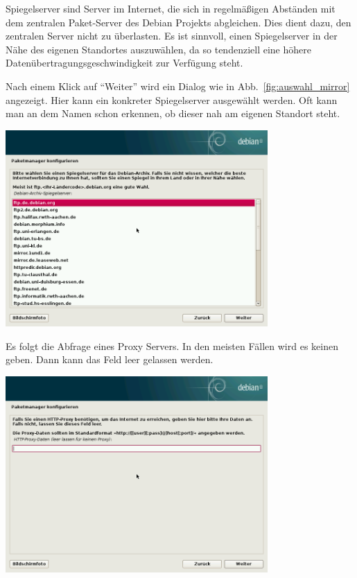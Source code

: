 \documentclass[a4paper,12pt,twoside]{article}
\begin{document}
Spiegelserver sind Server im Internet, die sich in regelmäßigen
Abständen mit dem zentralen Paket-Server des Debian Projekts
abgleichen. Dies dient dazu, den zentralen Server nicht zu überlasten.
Es ist sinnvoll, einen Spiegelserver in der Nähe des eigenen Standortes
auszuwählen, da so tendenziell eine höhere
Datenübertragungsgeschwindigkeit zur Verfügung steht.

Nach einem Klick auf "`Weiter"' wird
ein Dialog wie in Abb.~\ref{fig:auswahl_mirror} angezeigt. Hier kann ein
konkreter Spiegelserver ausgewählt werden. Oft kann man an dem Namen
schon erkennen, ob dieser nah am eigenen Standort steht.

\begin{minipage}{\linewidth}
    \centering
    \includegraphics[width=10cm]{screenshots/select_mirror.png}
    \label{fig:auswahl_mirror}
\end{minipage}
 
Es folgt die Abfrage eines Proxy Servers. In den meisten Fällen wird es
keinen geben. Dann kann das Feld leer gelassen werden.

\begin{minipage}{\linewidth}
    \centering
    \includegraphics[width=10cm]{screenshots/set_mirror_proxy.png}
    \label{fig:auswahl_proxy}
\end{minipage}
\end{document}
